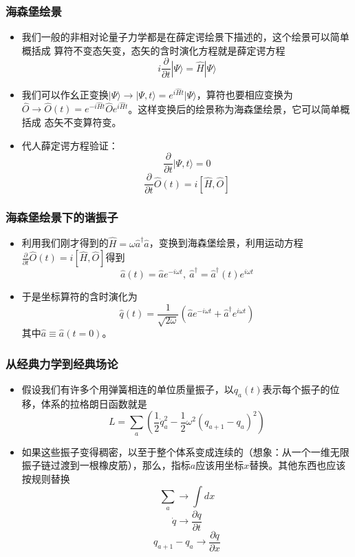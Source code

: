 \documentclass[CJK]{beamer}
\begin{document}
\begin{frame}
\frametitle{\bch 海森堡绘景 \ech}
\bch
\begin{itemize}
\item
我们一般的非相对论量子力学都是在薛定谔绘景下描述的，这个绘景可以简单概括成{\color{blue} 算符不变态矢变}，态矢的含时演化方程就是薛定谔方程
$$
i \frac{\partial}{\partial t} |\varPsi \rangle=\hat H | \varPsi \rangle
$$
\item
我们可以作幺正变换$|\varPsi \rangle \to |\varPsi, t\rangle = e^{i\hat H t} |\varPsi\rangle$，算符也要相应变换为$\hat O \to \hat O(t) = e^{-i \hat H t} \hat O e^{i \hat H t}$。这样变换后的绘景称为海森堡绘景，它可以简单概括成{\color{blue} 态矢不变算符变}。
\item
代人薛定谔方程验证：
$$
\frac{\partial }{\partial t} |\varPsi, t\rangle = 0 
$$
$$
\frac{\partial }{\partial t} \hat O(t) = i [\hat H,\hat O]
$$
\end{itemize}
\ech
\end{frame}

\begin{frame}
\frametitle{\bch 海森堡绘景下的谐振子 \ech}
\bch
\begin{itemize}
\item
利用我们刚才得到的$\hat H = \omega \hat a^\dagger \hat a$，变换到海森堡绘景，利用运动方程$\frac{\partial }{\partial t} \hat O(t) = i [\hat H,\hat O]$得到
$$
\hat a(t) = \hat a e^{-i\omega t},\ \hat a^\dagger = \hat a^\dagger (t) e^{i\omega t}
$$
\item
于是坐标算符的含时演化为
$$
\hat q(t) = \frac{1}{\sqrt{2\omega}} (\hat a e^{-i\omega t} + \hat a^\dagger e^{i \omega t})
$$
其中$\hat a \equiv \hat a(t=0)$。
\end{itemize}
\ech
\end{frame}

\begin{frame}
\frametitle{\bch 从经典力学到经典场论 \ech}
\bch
\begin{itemize}
\item
假设我们有许多个用弹簧相连的单位质量振子，以$q_a(t)$表示每个振子的位移，体系的拉格朗日函数就是
$$
L = \sum_a \left( \frac{1}{2} \dot{q}_a^2 - \frac{1}{2}\omega^2 (q_{a+1} - q_a)^2\right)
$$
\item
如果这些振子变得稠密，以至于整个体系变成连续的（想象：从一个一维无限振子链过渡到一根橡皮筋），那么，指标$a$应该用坐标$x$替换。其他东西也应该按规则替换
$$
\sum_a \to \int dx
$$
$$
\dot q \to \frac{\partial q}{\partial t}
$$
$$
q_{a+1} - q_a \to \frac{\partial q}{\partial x}
$$
\end{itemize}
\ech
\end{frame}
\end{document}
